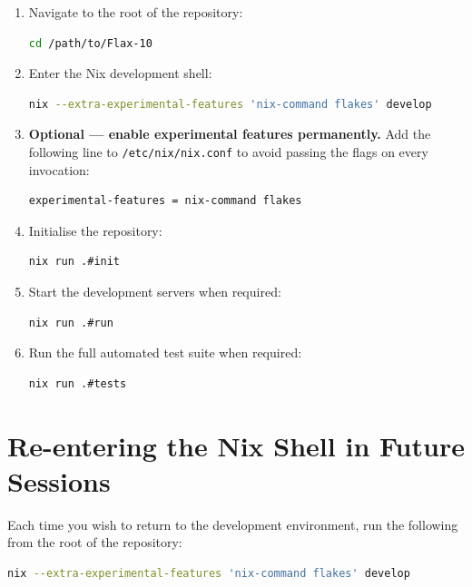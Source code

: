 \documentclass[a4paper, 12pt]{report}
\begin{document}
\begin{enumerate}
    \item Navigate to the root of the repository:
\begin{lstlisting}[language=bash]
cd /path/to/Flax-10
\end{lstlisting}

    \item Enter the Nix development shell:
\begin{lstlisting}[language=bash]
nix --extra-experimental-features 'nix-command flakes' develop
\end{lstlisting}

    \item \textbf{Optional --- enable experimental features permanently.}
          Add the following line to \texttt{/etc/nix/nix.conf} to avoid
          passing the flags on every invocation:
\begin{lstlisting}
experimental-features = nix-command flakes
\end{lstlisting}

    \item Initialise the repository:
\begin{lstlisting}[language=bash]
nix run .#init
\end{lstlisting}

    \item Start the development servers when required:
\begin{lstlisting}[language=bash]
nix run .#run
\end{lstlisting}

    \item Run the full automated test suite when required:
\begin{lstlisting}[language=bash]
nix run .#tests
\end{lstlisting}
\end{enumerate}

\section{Re-entering the Nix Shell in Future Sessions}

Each time you wish to return to the development environment, run the
following from the root of the repository:

\begin{lstlisting}[language=bash]
nix --extra-experimental-features 'nix-command flakes' develop
\end{lstlisting}
\end{document}
